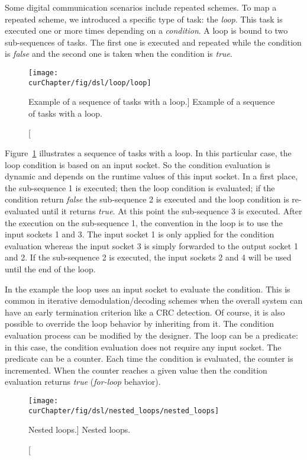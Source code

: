 Some digital communication scenarios include repeated schemes. To map a repeated
scheme, we introduced a specific type of task: the \emph{loop}. This task is
executed one or more times depending on a \emph{condition}. A loop is bound to
two sub-sequences of tasks. The first one is executed and repeated while the
condition is \emph{false} and the second one is taken when the condition is
\emph{true}.

\begin{figure}[htp]
  \centering
  \texttt{[image: \\curChapter/fig/dsl/loop/loop]}
  \caption
    [Example of a sequence of tasks with a loop.]
    {Example of a sequence of tasks with a loop.}
  \label{fig:dsl_loop}
\end{figure}

Figure~\ref{fig:dsl_loop} illustrates a sequence of tasks with a loop. In this
particular case, the loop condition is based on an input socket. So the
condition evaluation is dynamic and depends on the runtime values of this input
socket. In a first place, the sub-sequence 1 is executed; then the loop
condition is evaluated; if the condition return \emph{false} the sub-sequence 2
is executed and the loop condition is re-evaluated until it returns \emph{true}.
At this point the sub-sequence 3 is executed. After the execution on the
sub-sequence 1, the convention in the loop is to use the input sockets 1 and 3.
The input socket 1 is only applied for the condition evaluation whereas the
input socket 3 is simply forwarded to the output socket 1 and 2. If the
sub-sequence 2 is executed, the input sockets 2 and 4 will be used until the end
of the loop.

In the example the loop uses an input socket to evaluate the condition. This is
common in iterative demodulation/decoding schemes when the overall system can
have an early termination criterion like a CRC detection. Of course, it is also
possible to override the loop behavior by inheriting from it. The condition
evaluation process can be modified by the designer. The loop can be a predicate:
in this case, the condition evaluation does not require any input socket. The
predicate can be a counter. Each time the condition is evaluated, the counter is
incremented. When the counter reaches a given value then the condition
evaluation returns \emph{true} (\emph{for-loop} behavior).

\begin{figure}[htp]
  \centering
  \texttt{[image: \\curChapter/fig/dsl/nested\_loops/nested\_loops]}
  \caption
    [Nested loops.]
    {Nested loops.}
  \label{fig:dsl_nested_loops}
\end{figure}

